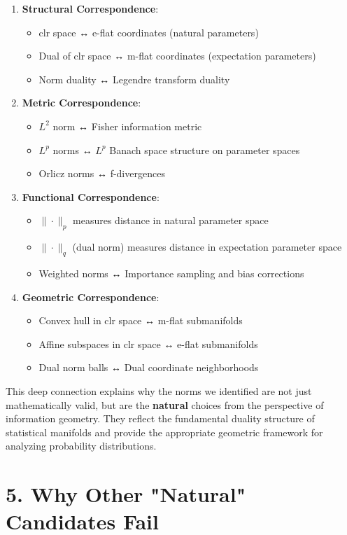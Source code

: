 \documentclass{amsart}
\theoremstyle{plain}
\theoremstyle{definition}
\theoremstyle{remark}
\begin{document}
\begin{enumerate}
	\item \textbf{Structural Correspondence}:
	\begin{itemize}
		\item clr space ↔ e-flat coordinates (natural parameters)
		\item Dual of clr space ↔ m-flat coordinates (expectation parameters)
		\item Norm duality ↔ Legendre transform duality
	\end{itemize}
	\item \textbf{Metric Correspondence}:
	\begin{itemize}
		\item $L^2$ norm ↔ Fisher information metric
		\item $L^p$ norms ↔ $L^p$ Banach space structure on parameter spaces
		\item Orlicz norms ↔ f-divergences
	\end{itemize}
	\item \textbf{Functional Correspondence}:
	\begin{itemize}
		\item $\|\cdot\|_p$ measures distance in natural parameter space
		\item $\|\cdot\|_q$ (dual norm) measures distance in expectation parameter space
		\item Weighted norms ↔ Importance sampling and bias corrections
	\end{itemize}
	\item \textbf{Geometric Correspondence}:
	\begin{itemize}
		\item Convex hull in clr space ↔ m-flat submanifolds
		\item Affine subspaces in clr space ↔ e-flat submanifolds
		\item Dual norm balls ↔ Dual coordinate neighborhoods
	\end{itemize}
\end{enumerate}

This deep connection explains why the norms we identified are not just mathematically valid, but are the \textbf{natural} choices from the perspective of information geometry. They reflect the fundamental duality structure of statistical manifolds and provide the appropriate geometric framework for analyzing probability distributions.

\section{5. Why Other "Natural" Candidates Fail}
\end{document}
